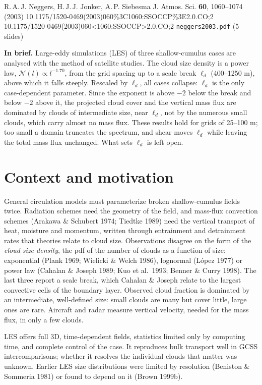 \documentclass[10pt,a4paper]{article}
\begin{document}
{R.\,A.\,J. Neggers, H.\,J.\,J. Jonker, A.\,P. Siebesma}
{J. Atmos. Sci. \textbf{60}, 1060--1074 (2003)}
{10.1175/1520-0469(2003)060\%3C1060:SSOCCP\%3E2.0.CO;2}
{10.1175/1520-0469(2003)060<1060:SSOCCP>2.0.CO;2}
{\texttt{neggers2003.pdf} (5 slides)}

\begin{summarybox}
\textbf{In brief.} Large-eddy simulations (LES) of three shallow-cumulus cases are analysed with the method of satellite studies. The cloud size density is a power law, $\mathcal N(l)\propto l^{-1.70}$, from the grid spacing up to a scale break $\ell_d$ (400--\num{1250} m), above which it falls steeply. Rescaled by $\ell_d$, all cases collapse: $\ell_d$ is the only case-dependent parameter. Since the exponent is above $-2$ below the break and below $-2$ above it, the projected cloud cover and the vertical mass flux are dominated by clouds of intermediate size, near $\ell_d$, not by the numerous small clouds, which carry almost no mass flux. These results hold for grids of 25--100 m; too small a domain truncates the spectrum, and shear moves $\ell_d$ while leaving the total mass flux unchanged. What sets $\ell_d$ is left open.
\end{summarybox}

\section{Context and motivation}
General circulation models must parameterize broken shallow-cumulus fields twice. Radiation schemes need the geometry of the field, and mass-flux convection schemes (Arakawa \& Schubert 1974; Tiedtke 1989) need the vertical transport of heat, moisture and momentum, written through entrainment and detrainment rates that theories relate to cloud size. Observations disagree on the form of the \emph{cloud size density}, the pdf of the number of clouds as a function of size: exponential (Plank 1969; Wielicki \& Welch 1986), lognormal (L\'opez 1977) or power law (Cahalan \& Joseph 1989; Kuo et al.\ 1993; Benner \& Curry 1998). The last three report a scale break, which Cahalan \& Joseph relate to the largest convective cells of the boundary layer. Observed cloud fraction is dominated by an intermediate, well-defined size: small clouds are many but cover little, large ones are rare. Aircraft and radar measure vertical velocity, needed for the mass flux, in only a few clouds.

LES offers full 3D, time-dependent fields, statistics limited only by computing time, and complete control of the case. It reproduces bulk transport well in GCSS intercomparisons; whether it resolves the individual clouds that matter was unknown. Earlier LES size distributions were limited by resolution (Beniston \& Sommeria 1981) or found to depend on it (Brown 1999b).
\end{document}
